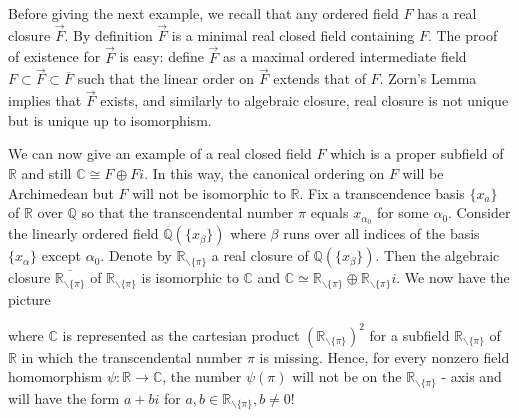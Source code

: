 \documentclass[11pt]{article}
\theoremstyle{plain}
\theoremstyle{definition}
\theoremstyle{remark}
\begin{document}
Before giving the next example, we recall that any ordered field $F$ has a real closure $\vec{F}$. By definition $\vec{F}$ is a minimal real closed field containing $F$. The proof of existence for $\vec{F}$ is easy: define $\vec{F}$ as a maximal ordered intermediate field $F \subset \vec{F} \subset \overline{F}$ such that the linear order on $\vec{F}$ extends that of $F$. Zorn's Lemma implies that $\vec{F}$ exists, and similarly to algebraic closure, real closure is not unique but is unique up to isomorphism.

We can now give an example of a real closed field $F$ which is a proper subfield of $\mathbb{R}$ and still $\mathbb{C} \cong F \oplus F i$. In this way, the canonical ordering on $F$ will be Archimedean but $F$ will not be isomorphic to $\mathbb{R}$. Fix a transcendence basis $\{x_a\}$ of $\mathbb{R}$ over $\mathbb{Q}$ so that the transcendental number $\pi$ equals $x_{\alpha_0}$ for some $\alpha_0$. Consider the linearly ordered field $\mathbb{Q}(\{x_\beta\})$ where $\beta$ runs over all indices of the basis $\{x_\alpha\}$ except $\alpha_0$. Denote by $\mathbb{R}_{\backslash\{\pi\}}$ a real closure of $\mathbb{Q}(\{x_\beta\})$. Then the algebraic closure $\overline{\mathbb{R}_{\backslash\{\pi\}}}$ of $\mathbb{R}_{\backslash\{\pi\}}$ is isomorphic to $\mathbb{C}$ and $\mathbb{C} \simeq \mathbb{R}_{\backslash\{\pi\}} \oplus \mathbb{R}_{\backslash\{\pi\}}i$.
We now have the picture


\begin{figure}[h!]
    \centering
    \caption{\label{diag2}}
\end{figure}
\noindent
where $\mathbb{C}$ is represented as the cartesian product $(\mathbb{R}_{\backslash\{\pi\}})^2$ for a subfield $\mathbb{R}_{\backslash\{\pi\}}$ of $\mathbb{R}$ in which the transcendental number $\pi$ is missing. Hence, for every nonzero field homomorphism $ \psi : \mathbb{R} \to \mathbb{C}$, the number $\psi(\pi)$ will not be on the $\mathbb{R}_{\backslash\{\pi\}}$ - axis and will have the form $a + bi$ for $a,b \in \mathbb{R}_{\backslash\{\pi\}}, b \neq 0$!
\newline
\end{document}
